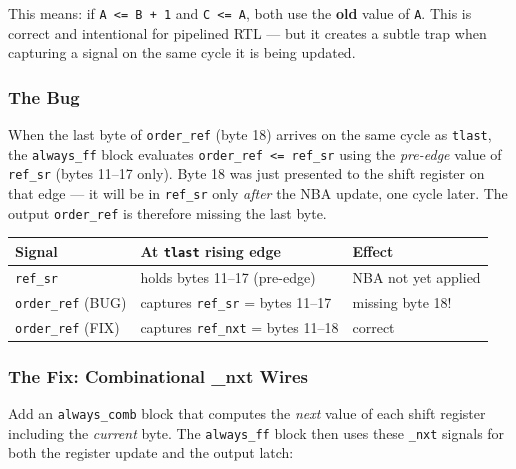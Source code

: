 \documentclass[11pt,a4paper]{article}
\begin{document}
This means: if \texttt{A <= B + 1} and \texttt{C <= A}, both use the \textbf{old}
value of \texttt{A}. This is correct and intentional for pipelined RTL --- but it
creates a subtle trap when capturing a signal on the same cycle it is being updated.

\subsubsection{The Bug}

When the last byte of \texttt{order\_ref} (byte 18) arrives on the same cycle
as \texttt{tlast}, the \texttt{always\_ff} block evaluates
\texttt{order\_ref <= ref\_sr} using the \emph{pre-edge} value of \texttt{ref\_sr}
(bytes 11--17 only). Byte 18 was just presented to the shift register on that
edge --- it will be in \texttt{ref\_sr} only \emph{after} the NBA update, one
cycle later. The output \texttt{order\_ref} is therefore missing the last byte.

\begin{center}
\small
\begin{tabular}{l l l}
\toprule
\textbf{Signal} & \textbf{At \texttt{tlast} rising edge} & \textbf{Effect} \\
\midrule
\texttt{ref\_sr}   & holds bytes 11--17 (pre-edge) & NBA not yet applied \\
\rowcolor{bugred!15}
\texttt{order\_ref} (BUG) & captures \texttt{ref\_sr} = bytes 11--17 & missing byte 18! \\
\rowcolor{fixgreen!15}
\texttt{order\_ref} (FIX) & captures \texttt{ref\_nxt} = bytes 11--18 & correct \\
\bottomrule
\end{tabular}
\end{center}

\subsubsection{The Fix: Combinational \_nxt Wires}

Add an \texttt{always\_comb} block that computes the \emph{next} value of each
shift register including the \emph{current} byte. The \texttt{always\_ff} block
then uses these \texttt{\_nxt} signals for both the register update and the output latch:
\end{document}
